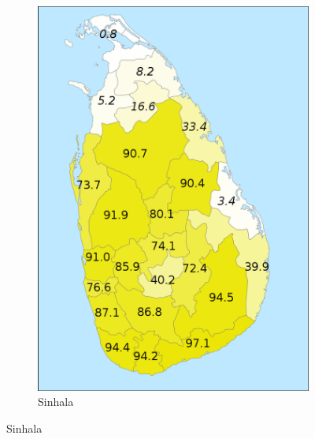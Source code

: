 \documentclass{article}
\begin{document}
\begin{figure}
\begin{center}
\begin{subfigure}[b]{.4\textwidth}{ 
\includegraphics[width=\textwidth]{SriLankaSinhalese.png}
\caption{Sinhala}
}
\end{subfigure}

\end{center}
\end{figure}
\end{document}

